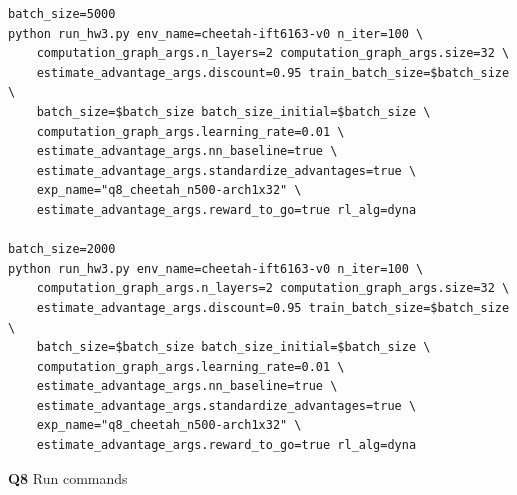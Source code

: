 \documentclass[11pt]{article}
\begin{document}
\begin{listing}[htbp]
\begin{verbatim}
batch_size=5000
python run_hw3.py env_name=cheetah-ift6163-v0 n_iter=100 \
    computation_graph_args.n_layers=2 computation_graph_args.size=32 \
    estimate_advantage_args.discount=0.95 train_batch_size=$batch_size \
    batch_size=$batch_size batch_size_initial=$batch_size \
    computation_graph_args.learning_rate=0.01 \
    estimate_advantage_args.nn_baseline=true \
    estimate_advantage_args.standardize_advantages=true \
    exp_name="q8_cheetah_n500-arch1x32" \
    estimate_advantage_args.reward_to_go=true rl_alg=dyna

batch_size=2000
python run_hw3.py env_name=cheetah-ift6163-v0 n_iter=100 \
    computation_graph_args.n_layers=2 computation_graph_args.size=32 \
    estimate_advantage_args.discount=0.95 train_batch_size=$batch_size \
    batch_size=$batch_size batch_size_initial=$batch_size \
    computation_graph_args.learning_rate=0.01 \
    estimate_advantage_args.nn_baseline=true \
    estimate_advantage_args.standardize_advantages=true \
    exp_name="q8_cheetah_n500-arch1x32" \
    estimate_advantage_args.reward_to_go=true rl_alg=dyna
\end{verbatim}
\caption{\textbf{Q8} Run commands}
\end{listing}
\end{document}
